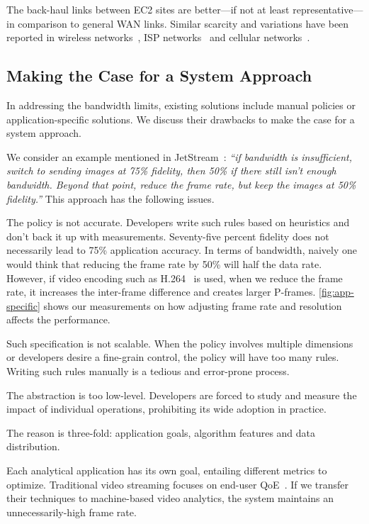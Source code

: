 The back-haul links between EC2 sites are better---if not at least
representative---in comparison to general WAN links. Similar scarcity and
variations have been reported in wireless networks~\cite{biswas2015large}, ISP
networks~\cite{grover2013peeking} and cellular
networks~\cite{nikravesh2014mobile}.

\subsection{Making the Case for a System Approach}
\label{sec:making-case-sys-approach}

In addressing the bandwidth limits, existing solutions include manual policies
or application-specific solutions. We discuss their drawbacks to make the case
for a system approach.

 We consider an example mentioned in
JetStream~\cite{rabkin2014aggregation}: \textit{``if bandwidth is insufficient,
  switch to sending images at 75\% fidelity, then 50\% if there still isn't
  enough bandwidth. Beyond that point, reduce the frame rate, but keep the
  images at 50\% fidelity.''} This approach has the following issues.

The policy is not accurate. Developers write such rules based on heuristics and
don't back it up with measurements. Seventy-five percent fidelity does not
necessarily lead to 75\% application accuracy. In terms of bandwidth, naively
one would think that reducing the frame rate by 50\% will half the data
rate. However, if video encoding such as H.264~\cite{richardson2011h} is used,
when we reduce the frame rate, it increases the inter-frame difference and
creates larger P-frames. \autoref{fig:app-specific} shows our measurements on
how adjusting frame rate and resolution affects the performance.

Such specification is not scalable. When the policy involves multiple dimensions
or developers desire a fine-grain control, the policy will have too many rules.
Writing such rules manually is a tedious and error-prone process.

The abstraction is too low-level. Developers are forced to study and measure the
impact of individual operations, prohibiting its wide adoption in practice.

 The reason is
three-fold: application goals, algorithm features and data distribution.

Each analytical application has its own goal, entailing different metrics to
optimize. Traditional video streaming focuses on end-user
QoE~\cite{yin2015control, michalos2012dynamic, pantos2016http}. If we transfer
their techniques to machine-based video analytics, the system maintains an
unnecessarily-high frame rate.

